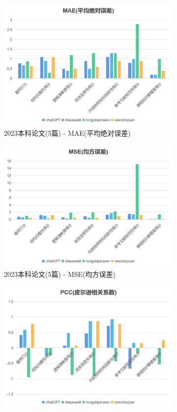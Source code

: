 \documentclass{article}
\begin{document}
\begin{figure}[h!]
	\centering
	\begin{subfigure}{0.3\linewidth}
		\centering
		\includegraphics[width=0.9\linewidth]{img/2023(5)-webui-MAE.png}
		\caption{2023本科论文(5篇) - MAE(平均绝对误差)}
		\label{fig:webui-2023(5)-MAE}
	\end{subfigure}
	\centering
	\begin{subfigure}{0.3\linewidth}
		\centering
		\includegraphics[width=0.9\linewidth]{img/2023(5)-webui-MSE.png}
		\caption{2023本科论文(5篇) - MSE(均方误差)}
		\label{fig:webui-2023(5)-MSE}
	\end{subfigure}
    \centering
	\begin{subfigure}{0.3\linewidth}
		\centering
		\includegraphics[width=0.9\linewidth]{img/2023(5)-webui-PCC.png}

\end{subfigure}
\end{figure}
\end{document}
